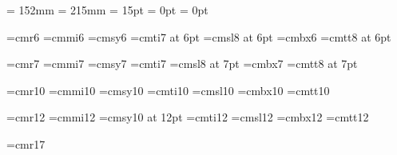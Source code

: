 




\hsize     = 152mm
\vsize     = 215mm
\topskip   =  15pt
  \parskip   =   0pt
  \parindent =   0pt

\raggedbottom

%



\font\sixrm=cmr6
\font\sixi=cmmi6
\font\sixsy=cmsy6
\font\sixit=cmti7 at 6pt
\font\sixsl=cmsl8 at 6pt
\font\sixbf=cmbx6
\font\sixtt=cmtt8 at 6pt

\font\sevenrm=cmr7
\font\seveni=cmmi7
\font\sevensy=cmsy7
\font\sevenit=cmti7
\font\sevensl=cmsl8 at 7pt
\font\sevenbf=cmbx7
\font\seventt=cmtt8 at 7pt

\font\tenrm=cmr10
\font\teni=cmmi10
\font\tensy=cmsy10
\font\tenit=cmti10
\font\tensl=cmsl10
\font\tenbf=cmbx10
\font\tentt=cmtt10

\font\twelverm=cmr12
\font\twelvei=cmmi12
\font\twelvesy=cmsy10 at 12pt
\font\twelveit=cmti12
\font\twelvesl=cmsl12
\font\twelvebf=cmbx12
\font\twelvett=cmtt12

\def\twelvepoint{%
\def\rm{\fam0\twelverm}%
\def\it{\fam\itfam\twelveit}%
\def\sl{\fam\slfam\twelvesl}%
\def\bf{\fam\bffam\twelvebf}%
\def\tt{\fam\ttfam\twelvett}%
\def\cal{\twelvesy}%
 \textfont0=\twelverm
  \scriptfont0=\sevenrm
  \scriptscriptfont0=\sixrm
 \textfont1=\twelvei
  \scriptfont1=\seveni
  \scriptscriptfont1=\sixi
 \textfont2=\twelvesy
  \scriptfont2=\sevensy
  \scriptscriptfont2=\sixsy
 \textfont3=\tenex
  \scriptfont3=\tenex
  \scriptscriptfont3=\tenex
 \textfont\itfam=\twelveit
 \textfont\slfam=\twelvesl
 \textfont\bffam=\twelvebf
 \textfont\ttfam=\twelvett
 \baselineskip=15pt
}


 \font\sixteenrm=cmr17

